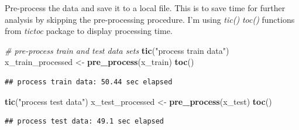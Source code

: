 \documentclass[]{article}
\newenvironment{Shaded}{\begin{snugshade}}{\end{snugshade}}
\newcommand{\CommentTok}[1]{\textcolor[rgb]{0.56,0.35,0.01}{\textit{#1}}}
\newcommand{\ControlFlowTok}[1]{\textcolor[rgb]{0.13,0.29,0.53}{\textbf{#1}}}
\newcommand{\DataTypeTok}[1]{\textcolor[rgb]{0.13,0.29,0.53}{#1}}
\newcommand{\KeywordTok}[1]{\textcolor[rgb]{0.13,0.29,0.53}{\textbf{#1}}}
\newcommand{\NormalTok}[1]{#1}
\newcommand{\OperatorTok}[1]{\textcolor[rgb]{0.81,0.36,0.00}{\textbf{#1}}}
\newcommand{\StringTok}[1]{\textcolor[rgb]{0.31,0.60,0.02}{#1}}
\begin{document}
Pre-process the data and save it to a local file. This is to save time
for further analysis by skipping the pre-processing procedure. I'm using
\emph{tic()} \emph{toc()} functions from \emph{tictoc} package to
display processing time.

\begin{Shaded}
\begin{Highlighting}[]
\CommentTok{# pre-process train and test data sets}
\KeywordTok{tic}\NormalTok{(}\StringTok{"process train data"}\NormalTok{)}
\NormalTok{x_train_processed <-}\StringTok{ }\KeywordTok{pre_process}\NormalTok{(x_train)}
\KeywordTok{toc}\NormalTok{()}
\end{Highlighting}
\end{Shaded}

\begin{verbatim}
## process train data: 50.44 sec elapsed
\end{verbatim}

\begin{Shaded}
\begin{Highlighting}[]
\KeywordTok{tic}\NormalTok{(}\StringTok{"process test data"}\NormalTok{)}
\NormalTok{x_test_processed <-}\StringTok{ }\KeywordTok{pre_process}\NormalTok{(x_test)}
\KeywordTok{toc}\NormalTok{()}
\end{Highlighting}
\end{Shaded}

\begin{verbatim}
## process test data: 49.1 sec elapsed
\end{verbatim}

\begin{Shaded}
\end{Shaded}
\end{document}
